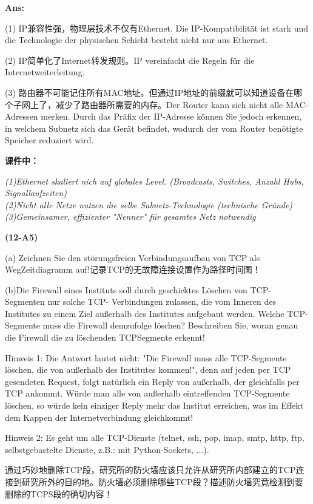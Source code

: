\documentclass[fleqn]{article}
\begin{document}
\textbf{Ans:}

(1) IP兼容性强，物理层技术不仅有Ethernet. Die IP-Kompatibilität ist stark und die Technologie der physischen Schicht besteht nicht nur aus Ethernet.

(2) IP简单化了Internet转发规则。IP vereinfacht die Regeln für die Internetweiterleitung.

(3) 路由器不可能记住所有MAC地址。但通过IP地址的前缀就可以知道设备在哪个子网上了，减少了路由器所需要的内存。Der Router kann sich nicht alle MAC-Adressen merken. Durch das Präfix der IP-Adresse können Sie jedoch erkennen, in welchem ​​Subnetz sich das Gerät befindet, wodurch der vom Router benötigte Speicher reduziert wird.

\textbf{课件中：}

\textit{(1)Ethernet skaliert nich auf globales Level. (Broadcasts, Switches, Anzahl Hubs, Signallaufzeiten)\\\indent (2)Nicht alle Netze nutzen die selbe Subnetz-Technologie (technische Gründe)\\\indent (3)Gemeinsamer, effizienter "Nenner" für gesamtes Netz notwendig}

\noindent\textbf{(12-A5)} 

(a) Zeichnen Sie den störungsfreien Verbindungsaufbau von TCP als WegZeitdiagramm auf!记录TCP的无故障连接设置作为路径时间图！

(b)Die Firewall eines Instituts soll durch geschicktes Löschen von TCP-Segmenten nur solche TCP- Verbindungen zulassen, die vom Inneren des Institutes zu einem Ziel außerhalb des Institutes aufgebaut werden. Welche TCP-Segmente muss die Firewall demzufolge löschen? Beschreiben Sie, woran genau die Firewall die zu löschenden TCPSegmente erkennt!

Hinweis 1: Die Antwort lautet nicht: "Die Firewall muss alle TCP-Segmente löschen, die von außerhalb des Institutes kommen!", denn auf jeden per TCP gesendeten Request, folgt natürlich ein Reply von außerhalb, der gleichfalls per TCP ankommt. Würde man alle von außerhalb eintreffenden TCP-Segmente löschen, so würde kein einziger Reply mehr das Institut erreichen, was im Effekt dem Kappen der Internetverbindung gleichkommt!

Hinweis 2: Es geht um alle TCP-Dienste (telnet, ssh, pop, imap, smtp, http, ftp, selbstgebastelte Dienste, z.B.: mit Python-Sockets, ...).

通过巧妙地删除TCP段，研究所的防火墙应该只允许从研究所内部建立的TCP连接到研究所外的目的地。防火墙必须删除哪些TCP段？描述防火墙究竟检测到要删除的TCPS段的确切内容！
\end{document}
